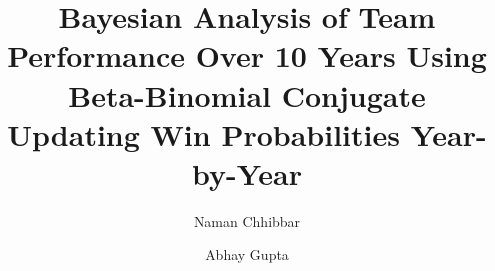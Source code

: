 \documentclass{beamer}
\title{Bayesian Analysis of Team Performance Over 10 Years Using Beta-Binomial Conjugate\\ \small Updating Win Probabilities Year-by-Year}
\author[Naman Chhibbar \\ Abhay Gupta]{
  Naman Chhibbar \and
  Abhay Gupta
}
\institute{Indian Institute of Technology Hyderabad}
\begin{document}
  \begin{frame}
    \titlepage
  \end{frame}

  
  
  
  
  
  
  
  
\end{document}
